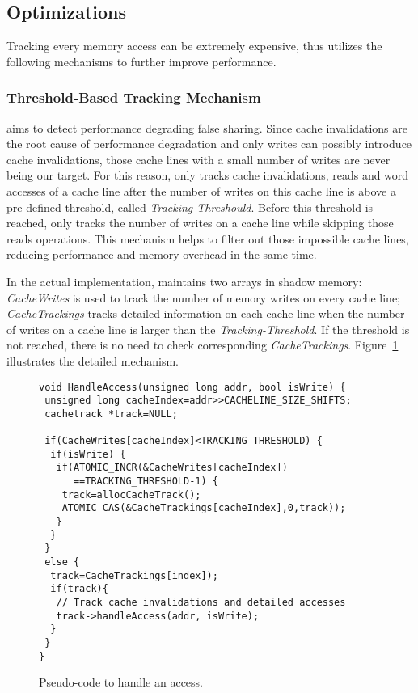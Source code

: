 \subsection{Optimizations}
\label{optimization}
Tracking every memory access can be extremely expensive, thus 
\Predator{} utilizes the following mechanisms to further improve performance.

\subsubsection{Threshold-Based Tracking Mechanism}
\label{sec:thresholdtracking}
\Predator{} aims to detect performance degrading false sharing.
Since cache invalidations are the root cause of performance degradation and only writes 
can possibly introduce cache invalidations, 
those cache lines with a small number of writes are never being our target.
For this reason, \Predator{} only tracks cache invalidations, reads and word accesses 
of a cache line after the number of writes on this cache line is above a
pre-defined threshold, called {\it Tracking-Threshould}. 
Before this threshold is reached, \Predator{} only tracks the number of writes on a cache line 
while skipping those reads operations. 
This mechanism helps to filter out
those impossible cache lines, reducing performance and memory overhead
in the same time.

In the actual implementation, \Predator{} maintains two arrays in shadow memory: 
{\it CacheWrites} is used to track the number of memory writes on every cache line;
{\it CacheTrackings} tracks detailed information 
on each cache line when the number of writes on a cache line is larger than
the {\it Tracking-Threshold}. 
If the threshold is not reached, there is no need to check corresponding {\it CacheTrackings}. 
Figure~\ref{fig:algorithm} illustrates the detailed mechanism.

\begin{figure}[!t]
\begin{lstlisting}
void HandleAccess(unsigned long addr, bool isWrite) {
 unsigned long cacheIndex=addr>>CACHELINE_SIZE_SHIFTS;
 cachetrack *track=NULL;

 if(CacheWrites[cacheIndex]<TRACKING_THRESHOLD) {
  if(isWrite) {
   if(ATOMIC_INCR(&CacheWrites[cacheIndex]) 
      ==TRACKING_THRESHOLD-1) {
    track=allocCacheTrack();
    ATOMIC_CAS(&CacheTrackings[cacheIndex],0,track));
   }
  } 
 }
 else {
  track=CacheTrackings[index]);
  if(track){
   // Track cache invalidations and detailed accesses
   track->handleAccess(addr, isWrite);
  }
 }
}
\end{lstlisting}
\caption{Pseudo-code to handle an access.\label{fig:algorithm}}
\end{figure}


